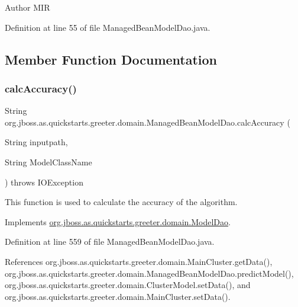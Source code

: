 \begin{DoxyAuthor}{Author}
M\+IR 
\end{DoxyAuthor}


Definition at line 55 of file Managed\+Bean\+Model\+Dao.\+java.



\subsection{Member Function Documentation}
\mbox{\label{classorg_1_1jboss_1_1as_1_1quickstarts_1_1greeter_1_1domain_1_1_managed_bean_model_dao_ab92b0e5250b87e53aedff8796054c433}} 
\subsubsection{\texorpdfstring{calc\+Accuracy()}{calcAccuracy()}}
{\footnotesize\ttfamily String org.\+jboss.\+as.\+quickstarts.\+greeter.\+domain.\+Managed\+Bean\+Model\+Dao.\+calc\+Accuracy (\begin{DoxyParamCaption}\item[{String}]{inputpath,  }\item[{String}]{Model\+Class\+Name }\end{DoxyParamCaption}) throws I\+O\+Exception}



This function is used to calculate the accuracy of the algorithm. 



Implements \hyperlink{interfaceorg_1_1jboss_1_1as_1_1quickstarts_1_1greeter_1_1domain_1_1_model_dao_afb454f408ff6b9892a5d6e59cddca2c0}{org.\+jboss.\+as.\+quickstarts.\+greeter.\+domain.\+Model\+Dao}.



Definition at line 559 of file Managed\+Bean\+Model\+Dao.\+java.



References org.\+jboss.\+as.\+quickstarts.\+greeter.\+domain.\+Main\+Cluster.\+get\+Data(), org.\+jboss.\+as.\+quickstarts.\+greeter.\+domain.\+Managed\+Bean\+Model\+Dao.\+predict\+Model(), org.\+jboss.\+as.\+quickstarts.\+greeter.\+domain.\+Cluster\+Model.\+set\+Data(), and org.\+jboss.\+as.\+quickstarts.\+greeter.\+domain.\+Main\+Cluster.\+set\+Data().

